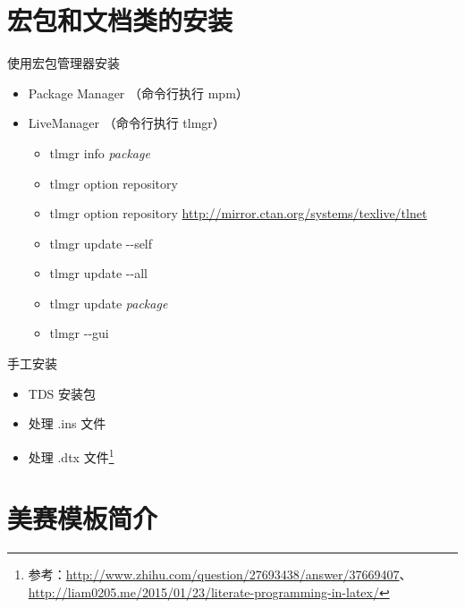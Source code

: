 \documentclass{beamer}
\renewcommand{\TeX}{\hologo{TeX}}
\newcommand{\MiKTeX}{\hologo{MiKTeX}}
\newcommand{\TeXLive}{\TeX{} Live}
\newcommand{\file}{\textsf}
\begin{document}
\section{宏包和文档类的安装}

\begin{frame}
\end{frame}


\begin{frame}{使用宏包管理器安装}
  \begin{itemize}
    \item \MiKTeX{} Package Manager （命令行执行 mpm）\pause
    \item \TeXLive Manager （命令行执行 tlmgr）
    \begin{itemize}
      \item tlmgr info \emph{package}\pause
      \item tlmgr option repository
      \item tlmgr option repository \url{http://mirror.ctan.org/systems/texlive/tlnet}\pause
      \item tlmgr update -{}-self
      \item tlmgr update -{}-all
      \item tlmgr update \emph{package}\pause
      \item tlmgr -{}-gui
    \end{itemize}
  \end{itemize}
\end{frame}

\begin{frame}{手工安装}
  \begin{itemize}
    \item TDS 安装包\pause
    \item 处理 \file{.ins} 文件\pause
    \item 处理 \file{.dtx} 文件\footnote{参考：\url{http://www.zhihu.com/question/27693438/answer/37669407}、\\\qquad\url{http://liam0205.me/2015/01/23/literate-programming-in-latex/}}
  \end{itemize}
\end{frame}

\section{美赛模板简介}

\begin{frame}
\end{frame}
\end{document}
